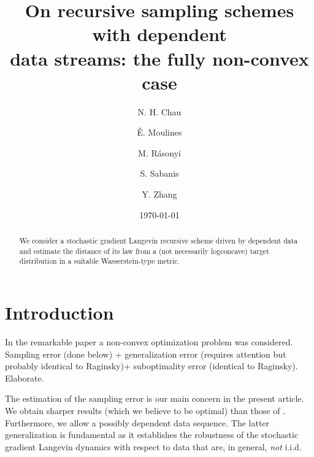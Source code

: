 \documentclass[a4paper,draft]{article}
\begin{document}
\title{On recursive sampling schemes with dependent\\ data streams:
the fully non-convex case
\footnotemark[1]}

\author{N. H. Chau\footnotemark[3] \and \'E. Moulines\footnotemark[4] \and
M. R\'asonyi\footnotemark[3] \and S. Sabanis\footnotemark[2] \and Y. Zhang\footnotemark[2]}

\renewcommand{\thefootnote}{\fnsymbol{footnote}}


\date{\today}

\maketitle

\begin{abstract}
We consider a stochastic gradient Langevin recursive scheme driven by
dependent data and estimate the distance of its law from a (not necessarily logconcave)
target distribution in a suitable Wasserstein-type metric.
\end{abstract}

\section{Introduction}

In the remarkable paper \cite{raginsky} a non-convex optimization problem was considered.
Sampling error (done below) + generalization error (requires attention but probably
identical to Raginsky)+ suboptimality error (identical to Raginsky). Elaborate.

The estimation of the sampling error is our main concern in the present article. We
obtain sharper results (which we believe to be optimal) than those of \cite{raginsky}.
Furthermore, we allow a possibly dependent data sequence. The latter generalization is fundamental
as it establishes the robustness of the stochastic gradient Langevin dynamics with respect to
data that are, in general, \emph{not} i.i.d.
\end{document}
